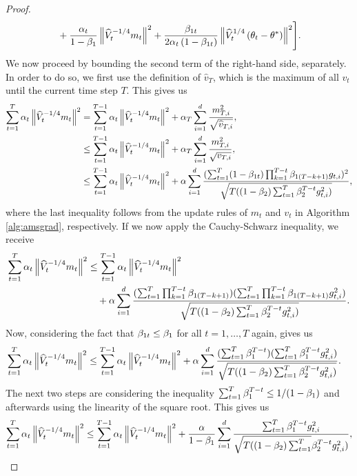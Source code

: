\begin{proof}
\begin{align}
&\quad +\frac{\alpha_t}{1-\beta_{1}} \left\| \widehat{V}_t^{-1/4} m_t \right\|^2 + \frac{\beta_{1t}}{2\alpha_t \left( 1-\beta_{1t} \right)} \left\| \widehat{V}_t^{1/4}\left(\theta_t -\theta^{\ast} \right) \right\|^2 \Biggr].
\end{align}
We now proceed by bounding the second term of the right-hand side, separately.\\
In order to do so, we first use the definition of $\hat{v}_T$, which is the maximum of all $v_t$ until the current time step $T$. This gives us
\begin{align*}
\sum_{t=1}^T \alpha_t \left\| \widehat{V}_t^{-1/4} m_t \right\|^2 &= \sum_{t=1}^{T-1} \alpha_t \left\| \widehat{V}_t^{-1/4} m_t \right\|^2 + \alpha_T \sum_{i=1}^{d} \frac{m_{T,i}^2}{\sqrt{\widehat{v}_{T,i}}},\\
&\leq \sum_{t=1}^{T-1} \alpha_t \left\| \widehat{V}_t^{-1/4} m_t \right\|^2 + \alpha_T \sum_{i=1}^{d} \frac{m_{T,i}^2}{\sqrt{v_{T,i}}},\\
&\leq \sum_{t=1}^{T-1} \alpha_t \left\| \widehat{V}_t^{-1/4} m_t \right\|^2 + \alpha \sum_{i=1}^{d} \frac{(\sum_{t=1}^T(1- \beta_{1t}) \prod_{k=1}^{T-t} \beta_{1(T-k+1)} g_{t,i})^2 }{\sqrt{T((1-\beta_2) \sum_{t=1}^T \beta_2^{T-t}g_{t,i}^2)}},
\end{align*}
where the last inequality follows from the update rules of $m_t$ and $v_t$ in Algorithm \ref{alg:amsgrad}, respectively. If we now apply the Cauchy-Schwarz inequality, we receive
\begin{align*}
\sum_{t=1}^T \alpha_t \left\| \widehat{V}_t^{-1/4} m_t \right\|^2 &\leq \sum_{t=1}^{T-1} \alpha_t \left\| \widehat{V}_t^{-1/4} m_t \right\|^2\\
&\quad + \alpha \sum_{i=1}^{d} \frac{(\sum_{t=1}^T\prod_{k=1}^{T-t}\beta_{1(T-k+1)}) (\sum_{t=1}^T\prod_{k=1}^{T-t} \beta_{1(T-k+1)} g_{t,i}^2 )}{\sqrt{T((1-\beta_2) \sum_{t=1}^T \beta_2^{T-t}g_{t,i}^2)}}.
\end{align*}
Now, considering the fact that $\beta_{1t}\leq \beta_1$ for all $t=1,\ldots,T$ again, gives us
\begin{align*}
\sum_{t=1}^T \alpha_t \left\| \widehat{V}_t^{-1/4} m_t \right\|^2 &\leq \sum_{t=1}^{T-1} \alpha_t \left\| \widehat{V}_t^{-1/4} m_t \right\|^2 + \alpha \sum_{i=1}^{d} \frac{(\sum_{t=1}^T\beta_1^{T-t}) (\sum_{t=1}^T\beta_1^{T-t}g_{t,i}^2 )}{\sqrt{T((1-\beta_2) \sum_{t=1}^T \beta_2^{T-t}g_{t,i}^2)}}.
\end{align*}
The next two steps are considering the inequality $\sum_{t=1}^T \beta_1^{T-t} \leq 1/(1-\beta_1)$ and afterwards using the linearity of the square root. This gives us
\begin{align*}
\sum_{t=1}^T \a_t \left\| \hat{V}_t^{-1/4} m_t \right\|^2 &\leq \sum_{t=1}^{T-1} \a_t \left\| \hat{V}_t^{-1/4} m_t \right\|^2 + \frac{\a}{1-\b_1} \sum_{i=1}^{d} \frac{\sum_{t=1}^T\b_1^{T-t}g_{t,i}^2}{\sqrt{T((1-\b_2) \sum_{t=1}^T} \b_2^{T-t}g_{t,i}^2)},\\

\end{align*}
\end{proof}
